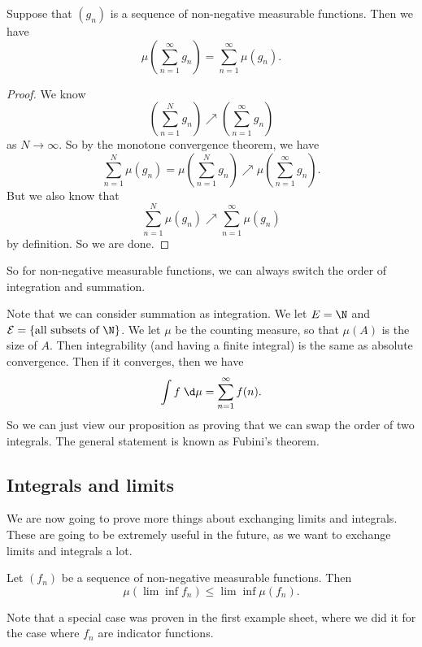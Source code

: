 \documentclass[a4paper]{article}
\begin{document}
\begin{prop}
  Suppose that $(g_n)$ is a sequence of non-negative measurable functions. Then we have
  \[
    \mu\left(\sum_{n = 1}^\infty g_n\right) = \sum_{n = 1}^\infty \mu(g_n).
  \]
\end{prop}

\begin{proof}
  We know
  \[
    \left(\sum_{n = 1}^N g_n\right) \nearrow \left(\sum_{n = 1}^\infty g_n\right)
  \]
  as $N \to \infty$. So by the monotone convergence theorem, we have
  \[
    \sum_{n = 1}^N \mu(g_n) = \mu \left(\sum_{n = 1}^N g_n\right) \nearrow \mu\left(\sum_{n = 1}^\infty g_n\right).
  \]
  But we also know that
  \[
    \sum_{n = 1}^N \mu(g_n) \nearrow \sum_{n = 1}^\infty \mu(g_n)
  \]
  by definition. So we are done.
\end{proof}

So for non-negative measurable functions, we can always switch the order of integration and summation.

Note that we can consider summation as integration. We let $E = \N$ and $\mathcal{E} = \{\text{all subsets of $\N$}\}$. We let $\mu$ be the counting measure, so that $\mu(A)$ is the size of $A$. Then integrability (and having a finite integral) is the same as absolute convergence. Then if it converges, then we have
\[
  \int f \;\d \mu = \sum_{n = 1}^\infty f(n).
\]
So we can just view our proposition as proving that we can swap the order of two integrals. The general statement is known as Fubini's theorem.

\subsection{Integrals and limits}
We are now going to prove more things about exchanging limits and integrals. These are going to be extremely useful in the future, as we want to exchange limits and integrals a lot.

\begin{thm}
  Let $(f_n)$ be a sequence of non-negative measurable functions. Then
  \[
    \mu(\lim\inf f_n) \leq \lim\inf \mu(f_n).
  \]
\end{thm}
Note that a special case was proven in the first example sheet, where we did it for the case where $f_n$ are indicator functions.
\end{document}
